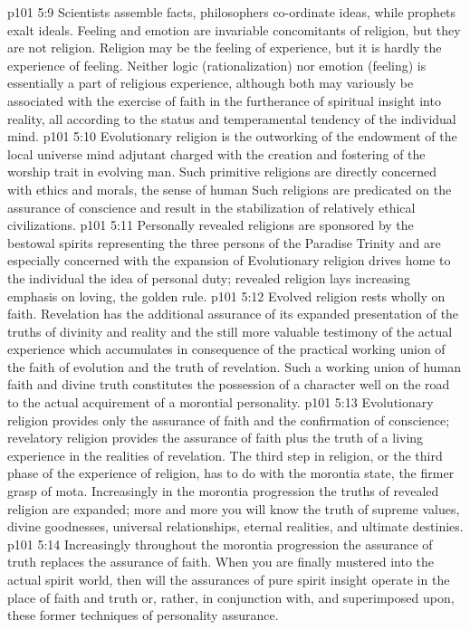 \pc \vs p101 5:9 Scientists assemble facts, philosophers co\hyp{}ordinate ideas, while prophets exalt ideals. Feeling and emotion are invariable concomitants of religion, but they are not religion. Religion may be the feeling of experience, but it is hardly the experience of feeling. Neither logic (rationalization) nor emotion (feeling) is essentially a part of religious experience, although both may variously be associated with the exercise of faith in the furtherance of spiritual insight into reality, all according to the status and temperamental tendency of the individual mind.
\vs p101 5:10 Evolutionary religion is the outworking of the endowment of the local universe mind adjutant charged with the creation and fostering of the worship trait in evolving man. Such primitive religions are directly concerned with ethics and morals, the sense of human  Such religions are predicated on the assurance of conscience and result in the stabilization of relatively ethical civilizations.
\vs p101 5:11 Personally revealed religions are sponsored by the bestowal spirits representing the three persons of the Paradise Trinity and are especially concerned with the expansion of  Evolutionary religion drives home to the individual the idea of personal duty; revealed religion lays increasing emphasis on loving, the golden rule.
\vs p101 5:12 Evolved religion rests wholly on faith. Revelation has the additional assurance of its expanded presentation of the truths of divinity and reality and the still more valuable testimony of the actual experience which accumulates in consequence of the practical working union of the faith of evolution and the truth of revelation. Such a working union of human faith and divine truth constitutes the possession of a character well on the road to the actual acquirement of a morontial personality.
\pc \vs p101 5:13 Evolutionary religion provides only the assurance of faith and the confirmation of conscience; revelatory religion provides the assurance of faith plus the truth of a living experience in the realities of revelation. The third step in religion, or the third phase of the experience of religion, has to do with the morontia state, the firmer grasp of mota. Increasingly in the morontia progression the truths of revealed religion are expanded; more and more you will know the truth of supreme values, divine goodnesses, universal relationships, eternal realities, and ultimate destinies.
\vs p101 5:14 Increasingly throughout the morontia progression the assurance of truth replaces the assurance of faith. When you are finally mustered into the actual spirit world, then will the assurances of pure spirit insight operate in the place of faith and truth or, rather, in conjunction with, and superimposed upon, these former techniques of personality assurance.
